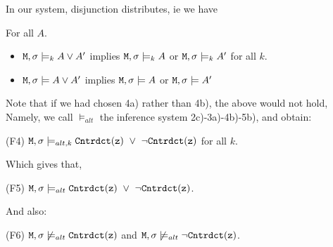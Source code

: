 \documentclass[acmsmall,screen]{acmart}
\begin{document}
\begin{observation}

In our system, disjunction distributes, ie we have

\begin{mylemma} For all $A$.

\begin{itemize}
\item
 ${\mbox{\tt{M}}}, \sigma \models_k  A \vee A' $ implies ${\mbox{\tt{M}}}, \sigma \models_k  A $ or  ${\mbox{\tt{M}}}, \sigma \models_k A' $ for all $k$.
 \item
 ${\mbox{\tt{M}}}, \sigma \models  A \vee A' $ implies ${\mbox{\tt{M}}}, \sigma \models   A $ or  ${\mbox{\tt{M}}}, \sigma \models  A' $
\end{itemize}
 \end{mylemma}


Note that if we had chosen 4a) rather than 4b), the above would not hold, Namely, we call $\models_{alt}$ the inference system 2c)-3a)-4b)-5b), and obtain:
\\
\strut \hspace{.3in}(F4) \hspace{.3in}   $\M,\sigma \models_{alt,k}   \prg{Cntrdct}(\prg{z})\ \vee\   \neg\prg{Cntrdct}(\prg{z})$ for  all   $k$.

Which gives that,\\
\strut \hspace{.3in}(F5) \hspace{.3in}   $\M,\sigma \models_{alt}   \prg{Cntrdct}(\prg{z})\ \vee\   \neg\prg{Cntrdct}(\prg{z})$.

And also:\\
\strut \hspace{.3in}(F6) \hspace{.3in}  ${\mbox{\tt{M}}},\sigma \not\models_{alt}   {\mbox{\tt{Cntrdct}}}({\mbox{\tt{z}}})$  and   ${\mbox{\tt{M}}},\sigma \not\models_{alt}   \neg{\mbox{\tt{Cntrdct}}}({\mbox{\tt{z}}})$.

\end{observation}
\end{document}
